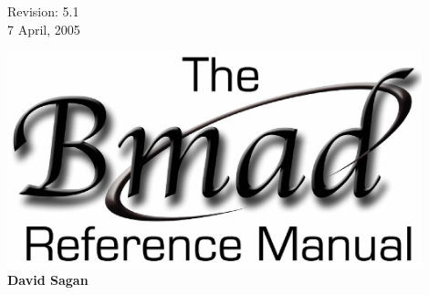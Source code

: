 \thispagestyle{empty}

\begin{flushright}
\large
  Revision: 5.1 \\
  7 April, 2005 \\
\end{flushright}

\vfill

{
\begin{center}
\includegraphics[width=12cm]{bmad_ref_manual.eps} \\
\vskip 0.3in
\huge\bf David Sagan
\end{center}
}

\vfill
\break